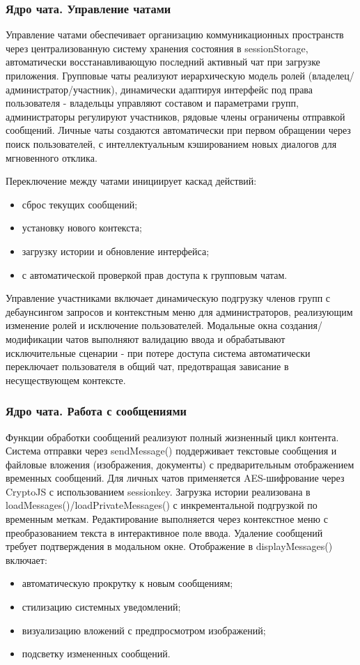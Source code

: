 \subsubsection{Ядро чата. Управление чатами}
Управление чатами обеспечивает организацию коммуникационных пространств через централизованную систему хранения состояния в sessionStorage, автоматически восстанавливающую последний активный чат при загрузке приложения. Групповые чаты реализуют иерархическую модель ролей (владелец/администратор/участник), динамически адаптируя интерфейс под права пользователя - владельцы управляют составом и параметрами групп, администраторы регулируют участников, рядовые члены ограничены отправкой сообщений. Личные чаты создаются автоматически при первом обращении через поиск пользователей, с интеллектуальным кэшированием новых диалогов для мгновенного отклика.

Переключение между чатами инициирует каскад действий:
\begin{itemize}
	\item сброс текущих сообщений;
	\item установку нового контекста;
	\item загрузку истории и обновление интерфейса;
	\item с автоматической проверкой прав доступа к групповым чатам. 
\end{itemize}

Управление участниками включает динамическую подгрузку членов групп с дебаунсингом запросов и контекстным меню для администраторов, реализующим изменение ролей и исключение пользователей. Модальные окна создания/модификации чатов выполняют валидацию ввода и обрабатывают исключительные сценарии - при потере доступа система автоматически переключает пользователя в общий чат, предотвращая зависание в несуществующем контексте.
\subsubsection{Ядро чата. Работа с сообщениями}
Функции обработки сообщений реализуют полный жизненный цикл контента. Система отправки через sendMessage() поддерживает текстовые сообщения и файловые вложения (изображения, документы) с предварительным отображением временных сообщений. Для личных чатов применяется AES-шифрование через CryptoJS с использованием session\-key. Загрузка истории реализована в loadMessages()/loadPrivateMessages() с инкрементальной подгрузкой по временным меткам. Редактирование выполняется через контекстное меню с преобразованием текста в интерактивное поле ввода. Удаление сообщений требует подтверждения в модальном окне. Отображение в displayMessages() включает:
\begin{itemize}
	\item автоматическую прокрутку к новым сообщениям;
	\item стилизацию системных уведомлений;
	\item визуализацию вложений с предпросмотром изображений;
	\item подсветку измененных сообщений.
\end{itemize}
